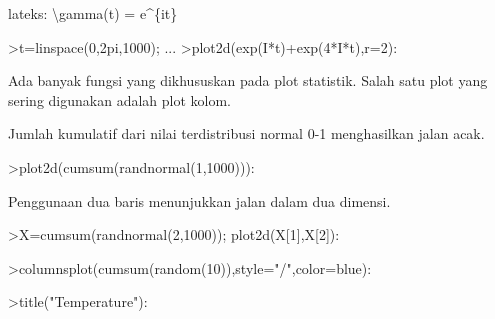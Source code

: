 \documentclass[a4paper,10pt]{article}
\begin{document}
\begin{eulernotebook}
\begin{eulercomment}
\begin{eulercomment}
\begin{eulercomment}
\begin{eulercomment}
\begin{eulercomment}
\begin{eulercomment}
\begin{eulercomment}
\begin{eulercomment}
\begin{eulercomment}
\begin{eulercomment}
\begin{eulercomment}
\begin{eulercomment}
\begin{eulercomment}
\begin{eulercomment}
\begin{eulercomment}
\begin{eulercomment}
\begin{eulercomment}
\begin{eulercomment}
\begin{eulercomment}
\begin{eulercomment}
\begin{eulercomment}
\begin{eulercomment}
\begin{eulercomment}
\begin{eulercomment}
\begin{eulercomment}
\begin{eulercomment}
\begin{eulercomment}
\begin{eulercomment}
\begin{eulercomment}
\begin{eulercomment}
\begin{eulercomment}
\begin{eulercomment}
\begin{eulercomment}
\begin{eulercomment}
\begin{eulercomment}
\begin{eulercomment}
\begin{eulercomment}
lateks: \textbackslash{}gamma(t) = e\textasciicircum{}\{it\}
\end{eulercomment}
\begin{eulerprompt}
>t=linspace(0,2pi,1000); ...
>plot2d(exp(I*t)+exp(4*I*t),r=2):
\end{eulerprompt}
\begin{eulercomment}
Ada banyak fungsi yang dikhususkan pada plot statistik. Salah satu
plot yang sering digunakan adalah plot kolom.

Jumlah kumulatif dari nilai terdistribusi normal 0-1 menghasilkan
jalan acak.
\end{eulercomment}
\begin{eulerprompt}
>plot2d(cumsum(randnormal(1,1000))):
\end{eulerprompt}
\begin{eulercomment}
Penggunaan dua baris menunjukkan jalan dalam dua dimensi.
\end{eulercomment}
\begin{eulerprompt}
>X=cumsum(randnormal(2,1000)); plot2d(X[1],X[2]):
\end{eulerprompt}
\begin{eulerprompt}
>columnsplot(cumsum(random(10)),style="/",color=blue):
\end{eulerprompt}
\begin{eulerprompt}
>title("Temperature"):
\end{eulerprompt}

\end{eulercomment}
\end{eulercomment}
\end{eulercomment}
\end{eulercomment}
\end{eulercomment}
\end{eulercomment}
\end{eulercomment}
\end{eulercomment}
\end{eulercomment}
\end{eulercomment}
\end{eulercomment}
\end{eulercomment}
\end{eulercomment}
\end{eulercomment}
\end{eulercomment}
\end{eulercomment}
\end{eulercomment}
\end{eulercomment}
\end{eulercomment}
\end{eulercomment}
\end{eulercomment}
\end{eulercomment}
\end{eulercomment}
\end{eulercomment}
\end{eulercomment}
\end{eulercomment}
\end{eulercomment}
\end{eulercomment}
\end{eulercomment}
\end{eulercomment}
\end{eulercomment}
\end{eulercomment}
\end{eulercomment}
\end{eulercomment}
\end{eulercomment}
\end{eulercomment}
\end{eulernotebook}
\end{document}
